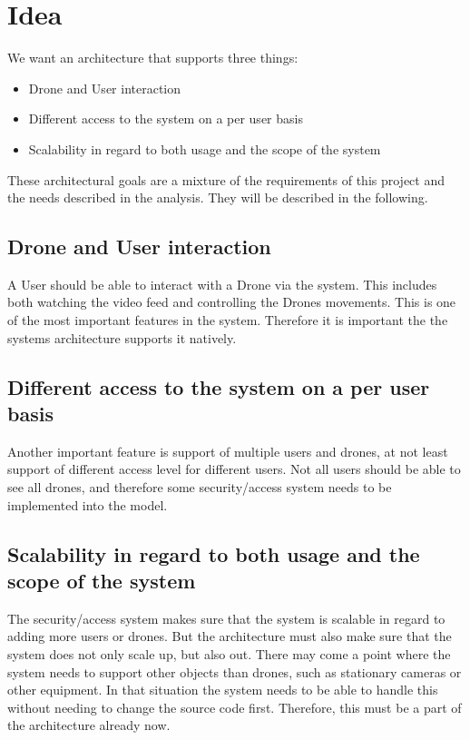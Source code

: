 

\section{Idea}
We want an architecture that supports three things:

\begin{itemize}
	\item Drone and User interaction
	\item Different access to the system on a per user basis 
	\item Scalability in regard to both usage and the scope of the system
\end{itemize}

These architectural goals are a mixture of the requirements of this project and the needs described in the analysis. 
They will be described in the following. 


\subsection{Drone and User interaction}
A User should be able to interact with a Drone via the system.
This includes both watching the video feed and controlling the Drones movements.
This is one of the most important features in the system.
Therefore it is important the the systems architecture supports it natively. 


\subsection{Different access to the system on a per user basis}
Another important feature is support of multiple users and drones, at not least support of different access level for different users.
Not all users should be able to see all drones, and therefore some security/access system needs to be implemented into the model. 


\subsection{Scalability in regard to both usage and the scope of the system}
The security/access system makes sure that the system is scalable in regard to adding more users or drones. 
But the architecture must also make sure that the system does not only scale up, but also out. 
There may come a point where the system needs to support other objects than drones, such as stationary cameras or other equipment. 
In that situation the system needs to be able to handle this without needing to change the source code first.
Therefore, this must be a part of the architecture already now. 

